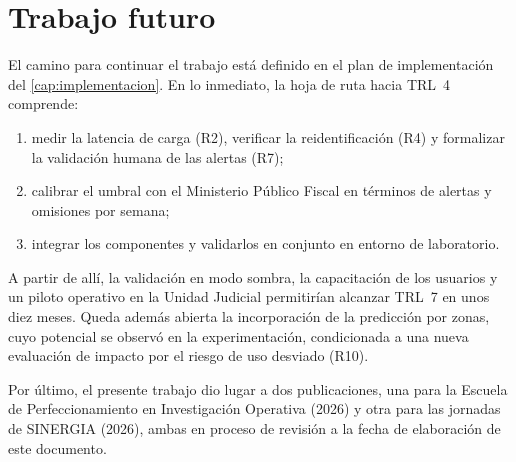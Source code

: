 \section{Trabajo futuro}\label{sec:trabajo-futuro}

El camino para continuar el trabajo está definido en el plan de implementación del \cref{cap:implementacion}. En lo inmediato, la hoja de ruta hacia TRL~4 comprende:

\begin{enumerate}[itemsep=2pt]
    \item medir la latencia de carga (R2), verificar la reidentificación (R4) y formalizar la validación humana de las alertas (R7);
    \item calibrar el umbral con el Ministerio Público Fiscal en términos de alertas y omisiones por semana;
    \item integrar los componentes y validarlos en conjunto en entorno de laboratorio.
\end{enumerate}

A partir de allí, la validación en modo sombra, la capacitación de los usuarios y un piloto operativo en la Unidad Judicial permitirían alcanzar TRL~7 en unos diez meses. Queda además abierta la incorporación de la predicción por zonas, cuyo potencial se observó en la experimentación, condicionada a una nueva evaluación de impacto por el riesgo de uso desviado (R10).

Por último, el presente trabajo dio lugar a dos publicaciones, una para la Escuela de Perfeccionamiento en Investigación Operativa (2026) y otra para las jornadas de SINERGIA (2026), ambas en proceso de revisión a la fecha de elaboración de este documento.

